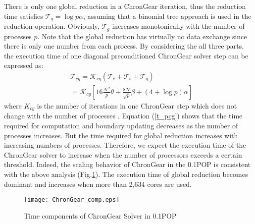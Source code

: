 There is only one global reduction in a ChronGear iteration,
thus the reduction time satisfies $\mathcal{T}_g= \log p \alpha$, assuming that a binomial tree approach is used in the reduction operation.
Obviously, $\mathcal{T}_g$ increases monotonically with the number of processes $p$.
Note that the global reduction has virtually no data exchange since there is only one number from each process.
By considering the all three parts, the execution time of one diagonal preconditioned ChronGear solver step can be expressed as:
\begin{eqnarray}
\label{t_pcg}
&\mathcal{T}_{cg}=\mathcal{K}_{cg} (\mathcal{T}_c + \mathcal{T}_b+\mathcal{T}_g )\nonumber \\
&=\mathcal{K}_{cg} [16 \frac{\mathcal{N}^2}{p}\theta + \frac{8\mathcal{N}}{\sqrt{p}}\beta +(4+\log p)\alpha]
\end{eqnarray}
where $K_{cg}$ is the number of iterations in one ChronGear step which does not change with the number of processes \cite{hu2013scalable}.
Equation (\ref{t_pcg}) shows that the time required for computation and boundary updating decreases as the number of processes increases.
But the time required for global reduction increases with increasing
numbers of processes. Therefore, we expect the execution time of the
ChronGear solver to increase when the number of processors exceeds a certain threshold.
Indeed, the scaling behavior of ChronGear in the 0.1\degree POP is consistent with the above analysis (Fig.\ref{fig:ChronGearCOMP}).
The execution time of global reduction becomes dominant and increases when more than 2,634 cores are used.


\begin{figure}[!t]
\vspace{-10pt}
\begin{center}
	\texttt{[image: ChronGear\_comp.eps]}
\end{center}
\caption[] {Time components of ChronGear Solver in 0.1\degree POP}
\label{fig:ChronGearCOMP}
\end{figure}

